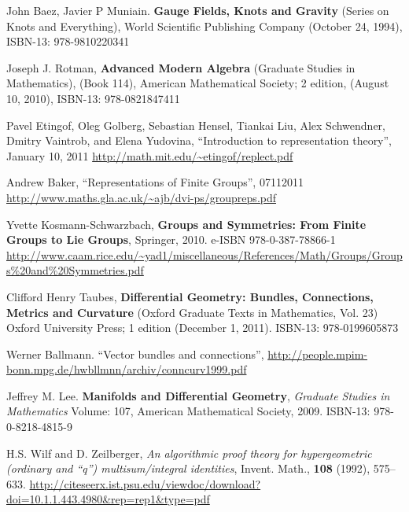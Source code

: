 \documentclass[10pt]{amsart}
\begin{document}
\begin{multicols*}{2}






\end{multicols*}

\begin{thebibliography}{9}

John Baez, Javier P Muniain.  \textbf{Gauge Fields, Knots and Gravity} (Series on Knots and Everything), World Scientific Publishing Company (October 24, 1994), ISBN-13: 978-9810220341

Joseph J. Rotman, \textbf{Advanced Modern Algebra} (Graduate Studies in Mathematics), (Book 114), American Mathematical Society; 2 edition, (August 10, 2010), ISBN-13: 978-0821847411

Pavel Etingof, Oleg Golberg, Sebastian Hensel, Tiankai Liu, Alex Schwendner, Dmitry Vaintrob, and Elena Yudovina, ``Introduction to representation theory'', January 10, 2011
\url{http://math.mit.edu/~etingof/replect.pdf}

Andrew Baker, ``Representations of Finite Groups'', 07112011
\url{http://www.maths.gla.ac.uk/~ajb/dvi-ps/groupreps.pdf}

Yvette Kosmann-Schwarzbach, \textbf{Groups and Symmetries: From Finite Groups to Lie Groups}, Springer, 2010. e-ISBN 978-0-387-78866-1 \url{http://www.caam.rice.edu/~yad1/miscellaneous/References/Math/Groups/Groups\%20and\%20Symmetries.pdf}

Clifford Henry Taubes, \textbf{Differential Geometry: Bundles, Connections, Metrics and Curvature} (Oxford Graduate Texts in Mathematics, Vol. 23) Oxford University Press; 1 edition (December 1, 2011). ISBN-13: 978-0199605873

Werner Ballmann. ``Vector bundles and connections'', \url{http://people.mpim-bonn.mpg.de/hwbllmnn/archiv/conncurv1999.pdf}

Jeffrey M. Lee. \textbf{Manifolds and Differential Geometry}, \emph{Graduate Studies in Mathematics} Volume: 107, American Mathematical Society, 2009. ISBN-13: 978-0-8218-4815-9

H.S. Wilf and D. Zeilberger, \emph{An algorithmic proof theory for hypergeometric (ordinary and “q”) multisum/integral identities}, Invent. Math., \textbf{108} (1992), 575–633.  \url{http://citeseerx.ist.psu.edu/viewdoc/download?doi=10.1.1.443.4980&rep=rep1&type=pdf}

\end{thebibliography}
\end{document}
